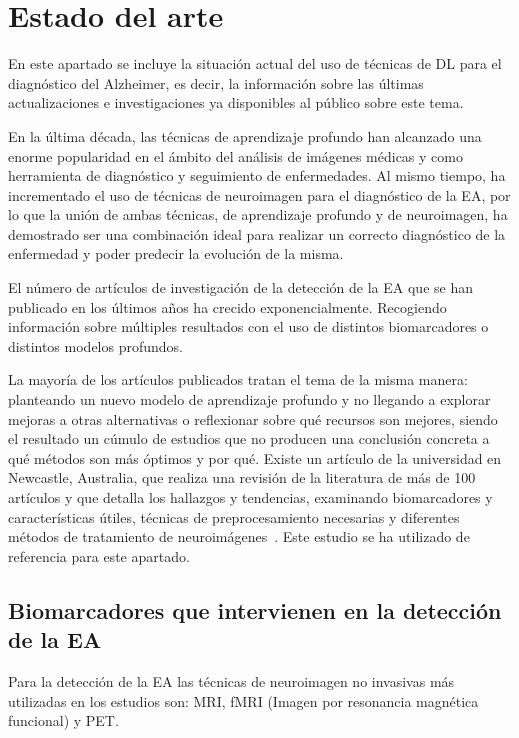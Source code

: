 \chapter{Estado del arte}\label{ch:estado-del-arte}
En este apartado se incluye la situación actual del uso de técnicas de DL para el diagnóstico del Alzheimer, es decir,
la información sobre las últimas actualizaciones e investigaciones ya disponibles al público sobre este tema.

En la última década, las técnicas de aprendizaje profundo han alcanzado una enorme popularidad en el ámbito del análisis
de imágenes médicas y como herramienta de diagnóstico y seguimiento de enfermedades.
Al mismo tiempo, ha incrementado el uso de técnicas de neuroimagen para el diagnóstico de la EA, por lo que la unión de
ambas técnicas, de aprendizaje profundo y de neuroimagen, ha demostrado ser una combinación ideal para realizar un
correcto diagnóstico de la enfermedad y poder predecir la evolución de la misma.

El número de artículos de investigación de la detección de la EA que se han publicado en los últimos años ha crecido
exponencialmente.
Recogiendo información sobre múltiples resultados con el uso de distintos biomarcadores o distintos modelos profundos.

La mayoría de los artículos publicados tratan el tema de la misma manera: planteando un nuevo modelo de aprendizaje
profundo y no llegando a explorar mejoras a otras alternativas o reflexionar sobre qué recursos son mejores, siendo el
resultado un cúmulo de estudios que no producen una conclusión concreta a qué métodos son más óptimos y por qué.
Existe un artículo de la universidad en Newcastle, Australia, que realiza una revisión de la literatura de más de 100
artículos y que detalla los hallazgos y tendencias, examinando biomarcadores y características útiles, técnicas de
preprocesamiento necesarias y diferentes métodos de tratamiento de neuroimágenes~\cite{literature-review}.
Este estudio se ha utilizado de referencia para este apartado.

\section{Biomarcadores que intervienen en la detección de la EA}\label{sec:biomarcadores-estado-del-arte}
Para la detección de la EA las técnicas de neuroimagen no invasivas más utilizadas en los estudios son: MRI, fMRI
(Imagen por resonancia magnética funcional)  y PET.

